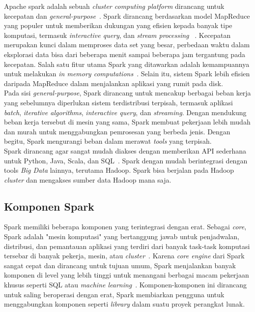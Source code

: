 Apache spark adalah sebuah {\it cluster computing platform} dirancang untuk kecepatan dan {\it general-purpose}~\cite{holdenkarau:07:ls}. Spark dirancang berdasarkan model MapReduce yang populer untuk memberikan dukungan yang efisien kepada banyak tipe komputasi, termasuk {\it interactive query}, dan {\it stream processing} ~\cite{holdenkarau:07:ls}. Kecepatan merupakan kunci dalam memproses data set yang besar, perbedaan waktu dalam eksplorasi data bisa dari beberapa menit sampai beberapa jam tergantung pada kecepatan. Salah satu fitur utama Spark yang ditawarkan adalah kemampuannya untuk melakukan {\it in memory computations}~\cite{holdenkarau:07:ls}. Selain itu, sistem Spark lebih efisien daripada MapReduce dalam menjalankan aplikasi yang rumit pada disk.\\


Pada sisi {\it general-purpose}, Spark dirancang untuk mencakup berbagai beban kerja yang sebelumnya diperlukan sistem terdistribusi terpisah, termasuk aplikasi \textit{batch}, {\it iterative algorithms}, {\it interactive query}, dan \textit{streaming}. Dengan mendukung beban kerja tersebut di mesin yang sama, Spark membuat pekerjaan lebih mudah dan murah untuk menggabungkan pemrosesan yang berbeda jenis. Dengan begitu, Spark mengurangi beban dalam merawat \textit{tools} yang terpisah.\\

Spark dirancang agar sangat mudah diakses dengan memberikan API sederhana untuk Python, Java, Scala, dan SQL~\cite{holdenkarau:07:ls}. Spark dengan mudah berintegrasi dengan tools {\it Big Data} lainnya, terutama Hadoop. Spark bisa berjalan pada Hadoop {\it cluster} dan mengakses sumber data Hadoop mana saja.\\

\subsection{Komponen Spark}



Spark memiliki beberapa komponen yang terintegrasi dengan erat. Sebagai {\it core}, Spark adalah "mesin komputasi" yang bertanggung jawab untuk penjadwalan, distribusi, dan pemantauan aplikasi yang terdiri dari banyak task-task komputasi tersebar di banyak pekerja, mesin, atau {\it cluster}~\cite{holdenkarau:07:ls}. Karena {\it core engine} dari Spark sangat cepat dan dirancang untuk tujuan umum, Spark menjalankan banyak komponen di level yang lebih tinggi untuk menangani berbagai macam pekerjaan khusus seperti SQL atau {\it machine learning}~\cite{holdenkarau:07:ls}. Komponen-komponen ini dirancang untuk saling beroperasi dengan erat, Spark membiarkan pengguna untuk menggabungkan komponen seperti {\it library} dalam suatu proyek perangkat lunak.\\

